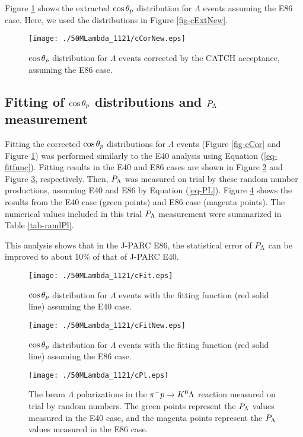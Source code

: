 Figure \ref{fig-cCorNew} shows the extracted $\cos{\theta_p}$ distribution for $\Lambda$ events assuming the E86 case. Here, we used the distributions in Figure \ref{fig-cExtNew}. 

\begin{figure}[h]
  \centering
  \texttt{[image: ./50MLambda\_1121/cCorNew.eps]}
  \caption{$\cos{\theta_p}$ distribution for $\Lambda$ events corrected by the CATCH acceptance, assuming the E86 case.}
  \label{fig-cCorNew}
\end{figure}


\subsection{Fitting of $\cos{\theta_p}$ distributions and $P_{\Lambda}$ measurement}
\label{subsec-randfit}

Fitting the corrected $\cos{\theta_p}$ distributions for $\Lambda$ events (Figure \ref{fig-cCor} and Figure \ref{fig-cCorNew}) was performed similarly to the E40 analysis using Equation (\ref{eq-fitfunc}). Fitting results in the E40 and E86 cases are shown in Figure \ref{fig-cFit} and Figure \ref{fig-cFitNew}, respectively. Then, $P_{\Lambda}$ was measured on trial by these random number productions, assuming E40 and E86 by Equation (\ref{eq-PL}). Figure \ref{fig-cPl} shows the results from the E40 case (green points) and E86 case (magenta points). The numerical values included in this trial $P_{\Lambda}$ measurement were summarized in Table \ref{tab-randPl}.

This analysis shows that in the J-PARC E86, the statistical error of $P_{\Lambda}$ can be improved to about 10\% of that of J-PARC E40.

\begin{figure}[h]
  \centering
  \texttt{[image: ./50MLambda\_1121/cFit.eps]}
  \caption{$\cos{\theta_p}$ distribution for $\Lambda$ events with the fitting function (red solid line) assuming the E40 case.}
  \label{fig-cFit}
\end{figure}

\begin{figure}[h]
  \centering
  \texttt{[image: ./50MLambda\_1121/cFitNew.eps]}
  \caption{$\cos{\theta_p}$ distribution for $\Lambda$ events with the fitting function (red solid line) assuming the E86 case.}
  \label{fig-cFitNew}
\end{figure}

\begin{figure}[h]
  \centering
  \texttt{[image: ./50MLambda\_1121/cPl.eps]}
  \caption{The beam $\Lambda$ polarizations in the $\pi^- p \to K^0 \Lambda$ reaction measured on trial by random numbers. The green points represent the $P_{\Lambda}$ values measured in the E40 case, and the magenta points represent the $P_{\Lambda}$ values measured in the E86 case.}
  \label{fig-cPl}
\end{figure}

